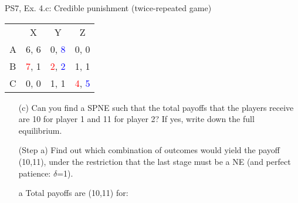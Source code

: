 \begin{frame}{PS7, Ex. 4.c: Credible punishment (twice-repeated game)}
    \vspace{-2pt}
    \begin{table}
      \begin{tabular}{l|c|c|c|}
        \multicolumn{1}{c}{} & \multicolumn{1}{c}{X} & \multicolumn{1}{c}{Y} & \multicolumn{1}{c}{Z}\\\cline{2-4}
        A   & 6, 6 &  0, \textcolor{blue}{8} &  0, 0  \\\cline{2-4}
        B & \textcolor{red}{7}, 1  & \textcolor{red}{2}, \textcolor{blue}{2} &  1, 1  \\\cline{2-4}
        C & 0, 0  & 1, 1 &  \textcolor{red}{4}, \textcolor{blue}{5}  \\\cline{2-4}
      \end{tabular}
    \end{table}
    \vspace{-4pt}
    \begin{itemize}
        \item[(c)] Can you find a SPNE such that the total payoffs that the players receive are 10 for player 1 and 11 for player 2? If yes, write down the full equilibrium.
    \end{itemize}
    \vspace{-8pt}
    \begin{multicols}{2}
      \begin{itemize}
        \item[(Step a)] Find out which combination of outcomes would yield the payoff (10,11), under the restriction that the last stage must be a NE (and perfect patience: $\delta$=1).
      \end{itemize}
      \vspace{-6pt}
      \vfill\null\columnbreak
      \begin{enumerate}
        \item[a] Total payoffs are (10,11) for:
      \end{enumerate}
      \vspace{-14pt}
      \vspace{-22pt}
      \vfill\null
    \end{multicols}
\end{frame}

